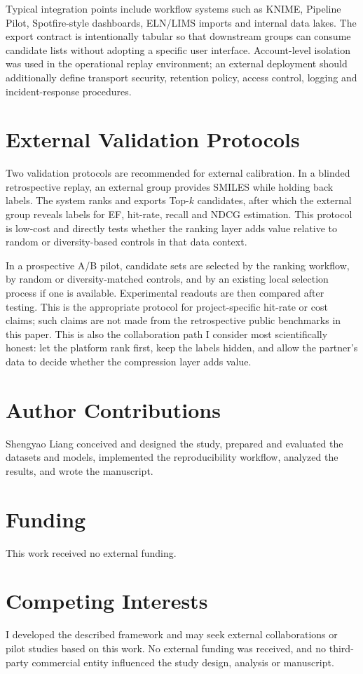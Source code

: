\documentclass[manuscript=article]{achemso}
\begin{document}
Typical integration points include workflow systems such as KNIME, Pipeline
Pilot, Spotfire-style dashboards, ELN/LIMS imports and internal data lakes. The
export contract is intentionally tabular so that downstream groups can consume
candidate lists without adopting a specific user interface. Account-level
isolation was used in the operational replay environment; an external
deployment should additionally define transport security, retention policy,
access control, logging and incident-response procedures.

\section{External Validation Protocols}
Two validation protocols are recommended for external calibration. In a
blinded retrospective replay, an external group provides SMILES while holding
back labels. The system ranks and exports Top-$k$ candidates, after which the
external group reveals labels for EF, hit-rate, recall and NDCG estimation.
This protocol is low-cost and directly tests whether the ranking layer adds
value relative to random or diversity-based controls in that data context.

In a prospective A/B pilot, candidate sets are selected by the ranking
workflow, by random or diversity-matched controls, and by an existing local
selection process if one is available. Experimental readouts are then compared
after testing. This is the appropriate protocol for project-specific hit-rate
or cost claims; such claims are not made from the retrospective public
benchmarks in this paper. This is also the collaboration path I consider most
scientifically honest: let the platform rank first, keep the labels hidden,
and allow the partner's data to decide whether the compression layer adds
value.

\section*{Author Contributions}
Shengyao Liang conceived and designed the study, prepared and evaluated the
datasets and models, implemented the reproducibility workflow, analyzed the
results, and wrote the manuscript.

\section*{Funding}
This work received no external funding.

\section*{Competing Interests}
I developed the described framework and may seek external collaborations or
pilot studies based on this work. No external funding was received, and no
third-party commercial entity influenced the study design, analysis or
manuscript.


\end{document}

